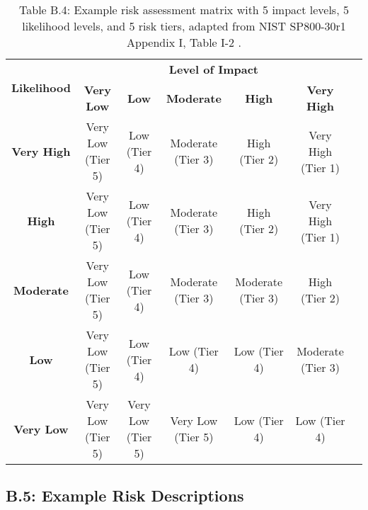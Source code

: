 \documentclass[fleqn]{article}
\begin{document}
\begin{table}[H]
	\caption*{Table B.4: Example risk assessment matrix with 5 impact levels, 5 likelihood levels, and 5 risk tiers, adapted from NIST SP800-30r1 Appendix I, Table I-2 \cite{nist80030r1}.}
	\small
	\begin{tabular}{|c|c|c|c|c|c|c|}
		\hline
		\multirow{2}{*}{\textbf{Likelihood}} & \multicolumn{5}{|c|}{\textbf{Level of Impact}}   \\
		\cline{2-6}
		& \textbf{Very Low} & \textbf{Low} & \textbf{Moderate} & \textbf{High} & \textbf{Very High} \\
		\hline
		\textbf{Very High} & Very Low (Tier 5) & Low (Tier 4) & Moderate (Tier 3) & High (Tier 2) & Very High 
		(Tier 1) \\
		\hline		
		\textbf{High} & Very Low (Tier 5) & Low (Tier 4) & Moderate (Tier 3)  & High (Tier 2) & Very High (Tier 1) \\
		\hline
		\textbf{Moderate} & Very Low (Tier 5) & Low (Tier 4) & Moderate (Tier 3)  & Moderate (Tier 3) & High (Tier 2) \\
		\hline
		\textbf{Low} & Very Low (Tier 5) & Low (Tier 4) & Low (Tier 4)  & Low (Tier 4) & Moderate (Tier 3) \\
		\hline
		\textbf{Very Low} & Very Low (Tier 5) & Very Low (Tier 5) & Very Low (Tier 5) & Low (Tier 4) & Low (Tier 4) \\
		\hline
	\end{tabular}
	\label{table:nist_risk_tiers}
\end{table}

\subsection*{B.5: Example Risk Descriptions}
\end{document}

